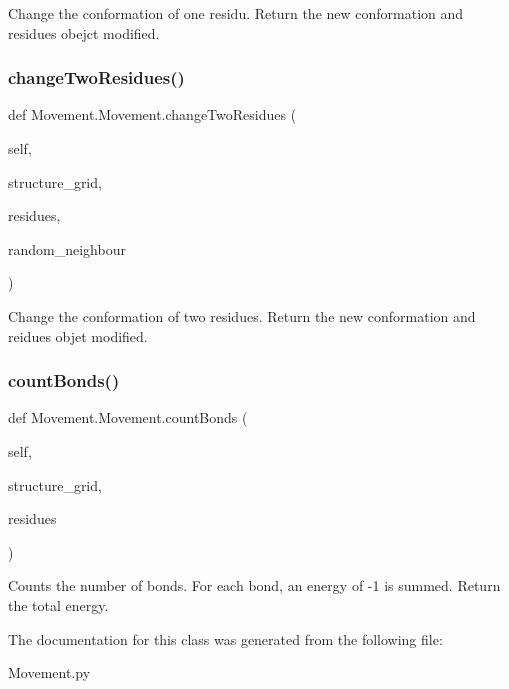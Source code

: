 \begin{DoxyVerb}Change the conformation of one residu.
    Return the new conformation and residues obejct modified.
\end{DoxyVerb}
 \mbox{\label{classMovement_1_1Movement_a9052fb0d7d5328a995abee94111d9fcc}} 
\subsubsection{\texorpdfstring{change\+Two\+Residues()}{changeTwoResidues()}}
{\footnotesize\ttfamily def Movement.\+Movement.\+change\+Two\+Residues (\begin{DoxyParamCaption}\item[{}]{self,  }\item[{}]{structure\+\_\+grid,  }\item[{}]{residues,  }\item[{}]{random\+\_\+neighbour }\end{DoxyParamCaption})}

\begin{DoxyVerb}Change the conformation of two residues.
    Return the new conformation and reidues objet modified.
\end{DoxyVerb}
 \mbox{\label{classMovement_1_1Movement_a9a5855cfc798666c18371ea030ae54a7}} 
\subsubsection{\texorpdfstring{count\+Bonds()}{countBonds()}}
{\footnotesize\ttfamily def Movement.\+Movement.\+count\+Bonds (\begin{DoxyParamCaption}\item[{}]{self,  }\item[{}]{structure\+\_\+grid,  }\item[{}]{residues }\end{DoxyParamCaption})}

\begin{DoxyVerb}Counts the number of bonds. For each bond, an energy of -1 is summed.
    Return the total energy.
\end{DoxyVerb}
 

The documentation for this class was generated from the following file\+:\begin{DoxyCompactItemize}
\item 
Movement.\+py\end{DoxyCompactItemize}
